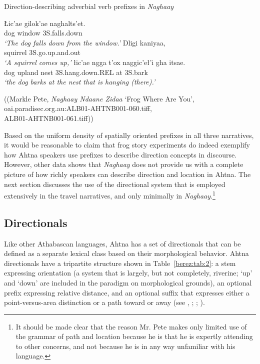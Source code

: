 \begin{exe}
\ex Direction-describing adverbial verb prefixes in \textit{Naghaay}\label{berez-ex3}
\begin{xlistn}
 \gll	Łic’ae	gilok'ae	naghalts’et.\\
		dog		window		3S.falls.down\\
	\glt	\textit{‘The dog falls down from the window.’}
\sn {[ \ldots ]}
	\gll			Dligi	kaniyaa,\\
		squirrel	3S.go.up.and.out\\
\glt	\textit{	‘A squirrel comes up,’}
 \gll			łic’ae	ngga	t’ox 	naggic’eł’i			gha		itsae.\\
		dog		upland	nest		3S.hang.down.REL	at		3S.bark\\
\glt		\textit{‘the dog barks at the nest that is hanging (there).’}
\end{xlistn}
\begin{flushright}
((Markle Pete, \textit{Naghaay Ndaane Zidaa} ‘Frog Where Are You’,\\
oai.paradisec.org.au:ALB01-AHTNB001-060.tiff,\\
ALB01-AHTNB001-061.tiff))
\end{flushright}
\end{exe}

\noindent
Based on the uniform density of spatially oriented prefixes in all three narratives, it would be reasonable to claim that frog story experiments do indeed exemplify how Ahtna speakers use prefixes to describe direction concepts in discourse. However, other data shows that \textit{Naghaay} does not provide us with a complete picture of how richly speakers can describe direction and location in Ahtna. The next section discusses the use of the directional system that is employed extensively in the travel narratives, and only minimally in \textit{Naghaay}.\footnote{It should be made clear that the reason Mr. Pete makes only limited use of the grammar of path and location because he is that he is expertly attending to other concerns, and not because he is in any way unfamiliar with his language.}

\subsection{Directionals}

Like other Athabascan languages, Ahtna has a set of directionals that can be defined as a separate lexical class based on their morphological behavior. Ahtna directionals have a tripartite structure shown in Table~\ref{berez:tab:2}: a stem expressing orientation (a system that is largely, but not completely, riverine; ‘up’ and ‘down’ are included in the paradigm on morphological grounds), an optional prefix expressing relative distance, and an optional suffix that expresses either a point-versus-area distinction or a path toward or away (see \citealt{Kari1985}, \citeyear{Kari1990}; \citealt{Leer1989}; \citealt{MooreTlen2007}).

